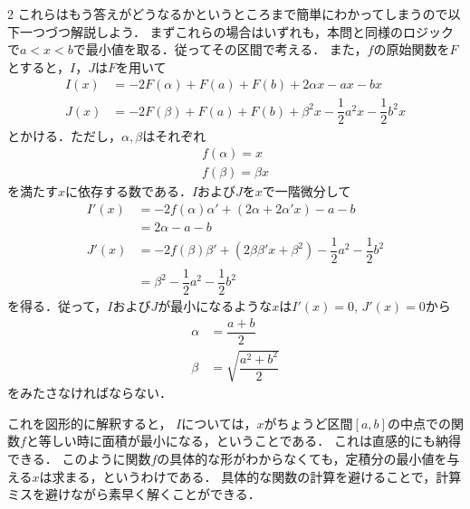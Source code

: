 \documentclass[../../main.tex]{subfiles}
\begin{document}
\begin{multicols}{2}
  これらはもう答えがどうなるかというところまで簡単にわかってしまうので以下一つづつ解説しよう．
  まずこれらの場合はいずれも，本問と同様のロジックで$a<x<b$で最小値を取る．従ってその区間で考える．
  また，$f$の原始関数を$F$とすると，$I$，$J$は$F$を用いて
  \begin{align}
    I(x) & = -2F(\alpha) + F(a) + F(b) + 2\alpha x - ax - bx                             \\
    J(x) & = -2F(\beta) + F(a) + F(b)  + \beta^2 x - \dfrac{1}{2}a^2 x - \dfrac{1}{2}b^2 x
  \end{align}
  とかける．ただし，$\alpha,\beta$はそれぞれ
  \begin{align}
    f(\alpha) = x \\
    f(\beta)  = \beta x
  \end{align}
  を満たす$x$に依存する数である．$I$および$J$を$x$で一階微分して
  \begin{align}
    I'(x)
    & = -2f(\alpha)\alpha' + (2\alpha + 2\alpha' x) - a - b \\
    & = 2\alpha - a - b \\
    J'(x)
    & = -2f(\beta)\beta' + (2\beta\beta' x + \beta^2) - \dfrac{1}{2}a^2 - \dfrac{1}{2}b^2 \\
    & = \beta^2 - \dfrac{1}{2}a^2 - \dfrac{1}{2}b^2
  \end{align}
  を得る．従って，$I$および$J$が最小になるような$x$は$I'(x)=0$, $J'(x)=0$から
  \begin{align}
    \alpha & = \dfrac{a+b}{2}            \\
    \beta  & = \sqrt{\dfrac{a^2+b^2}{2}}
  \end{align}
  をみたさなければならない．

  これを図形的に解釈すると，
  $I$については，$x$がちょうど区間$[a,b]$の中点での関数$f$と等しい時に面積が最小になる，ということである．
  これは直感的にも納得できる．%
  このように関数$f$の具体的な形がわからなくても，定積分の最小値を与える$x$は求まる，というわけである．
  具体的な関数の計算を避けることで，計算ミスを避けながら素早く解くことができる．

  \begin{figure}[H]
    \centering
\end{figure}
\end{multicols}
\end{document}
